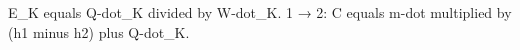 E_K equals Q-dot_K divided by W-dot_K.  
1 → 2:  
C equals m-dot multiplied by (h1 minus h2) plus Q-dot_K.